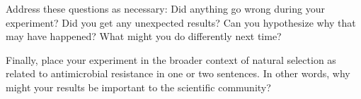 \documentclass[12pt]{exam}
\begin{document}
Address these questions as necessary: Did anything go wrong during your
experiment? Did you get any unexpected results? Can you hypothesize
why that may have happened? What might you do differently next time?

Finally, place your experiment in the broader context of natural
selection as related to antimicrobial resistance in one or two
sentences. In other words, why might your results be important to the
scientific community?




	


%
%
%
%



%
%
%
%	
%		
%
%
\end{document}
